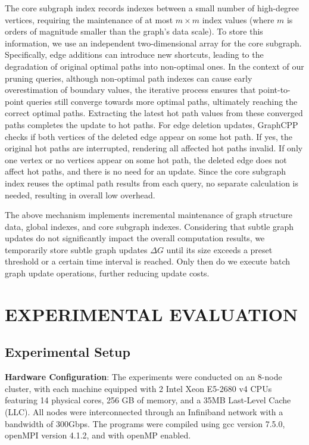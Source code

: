 \documentclass[lettersize,journal]{IEEEtran} %
\begin{document}
The core subgraph index records indexes between a small number of high-degree vertices, requiring the maintenance of at most $m \times m$ index values (where $m$ is orders of magnitude smaller than the graph's data scale). To store this information, we use an independent two-dimensional array for the core subgraph. Specifically, edge additions can introduce new shortcuts, leading to the degradation of original optimal paths into non-optimal ones. In the context of our pruning queries, although non-optimal path indexes can cause early overestimation of boundary values, the iterative process ensures that point-to-point queries still converge towards more optimal paths, ultimately reaching the correct optimal paths. Extracting the latest hot path values from these converged paths completes the update to hot paths. For edge deletion updates, GraphCPP checks if both vertices of the deleted edge appear on some hot path. If yes, the original hot paths are interrupted, rendering all affected hot paths invalid. If only one vertex or no vertices appear on some hot path, the deleted edge does not affect hot paths, and there is no need for an update. Since the core subgraph index reuses the optimal path results from each query, no separate calculation is needed, resulting in overall low overhead.

The above mechanism implements incremental maintenance of graph structure data, global indexes, and core subgraph indexes. Considering that subtle graph updates do not significantly impact the overall computation results, we temporarily store subtle graph updates $\Delta G$ until its size exceeds a preset threshold or a certain time interval is reached. Only then do we execute batch graph update operations, further reducing update costs.

\section{EXPERIMENTAL EVALUATION}
\subsection{Experimental Setup}

{\bf{Hardware Configuration}}: The experiments were conducted on an 8-node cluster, with each machine equipped with 2 Intel Xeon E5-2680 v4 CPUs featuring 14 physical cores, 256 GB of memory, and a 35MB Last-Level Cache (LLC). All nodes were interconnected through an Infiniband network with a bandwidth of 300Gbps. The programs were compiled using gcc version 7.5.0, openMPI version 4.1.2, and with openMP enabled.
    
\end{document}
